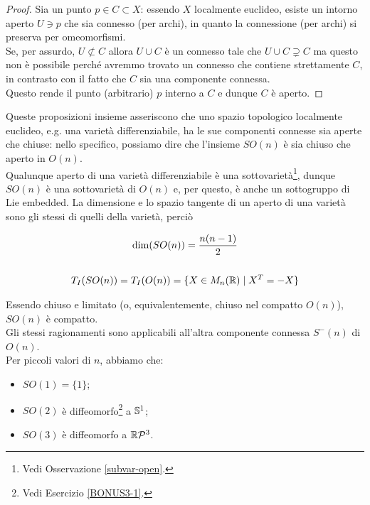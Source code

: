 \begin{proof}
	Sia un punto $ p \in C \subset X $: essendo $ X $ localmente euclideo, esiste un intorno aperto $ U \ni p $ che sia connesso (per archi), in quanto la connessione (per archi) si preserva per omeomorfismi.\\
	Se, per assurdo, $ U \not\subset C $ allora $ U \cup C $ è un connesso tale che $ U \cup C \supsetneq C $ ma questo non è possibile perché avremmo trovato un connesso che contiene strettamente $ C $, in contrasto con il fatto che $ C $ sia una componente connessa.\\
	Questo rende il punto (arbitrario) $ p $ interno a $ C $ e dunque $ C $ è aperto.
\end{proof}

Queste proposizioni insieme asseriscono che uno spazio topologico localmente euclideo, e.g. una varietà differenziabile, ha le sue componenti connesse sia aperte che chiuse: nello specifico, possiamo dire che l'insieme $ SO(n) $ è sia chiuso che aperto in $ O(n) $.\\
Qualunque aperto di una varietà differenziabile è una sottovarietà\footnote{%
	Vedi Osservazione \ref{subvar-open}.%
}, dunque $ SO(n) $ è una sottovarietà di $ O(n) $ e, per questo, è anche un sottogruppo di Lie embedded. La dimensione e lo spazio tangente di un aperto di una varietà sono gli stessi di quelli della varietà, perciò

\begin{gather}
	\dim(SO(n)) = \dfrac{n(n-1)}{2} \\
	\nonumber \\
	T_{I}(SO(n)) = T_{I}(O(n)) = \{ X \in M_{n}(\R) \mid X^{T} = -X \}
\end{gather}

Essendo chiuso e limitato (o, equivalentemente, chiuso nel compatto $ O(n) $), $ SO(n) $ è compatto.\\
Gli stessi ragionamenti sono applicabili all'altra componente connessa $ S^{-}(n) $ di $ O(n) $.\\
Per piccoli valori di $ n $, abbiamo che:

\begin{itemize}
	\item $ SO(1) = \{ 1 \} $;
	
	\item $ SO(2) $ è diffeomorfo\footnote{%
		Vedi Esercizio \ref{BONUS3-1}.%
	} a $ \S^{1} $;
	
	\item $ SO(3) $ è diffeomorfo a $ \rp{3} $.
\end{itemize}


